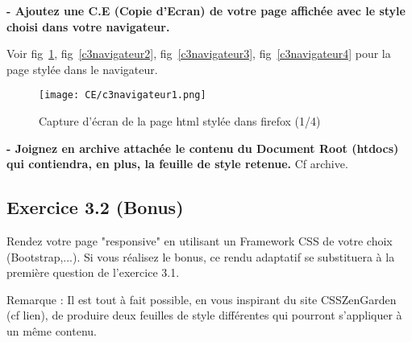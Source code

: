 \documentclass[11pt]{article}
\begin{document}

\textbf{- Ajoutez une C.E (Copie d’Ecran) de votre page affichée avec le style choisi dans votre navigateur.}

Voir fig~\ref{c3navigateur1}, fig~\ref{c3navigateur2}, fig~\ref{c3navigateur3}, fig~\ref{c3navigateur4} pour la page stylée dans le navigateur.

		\begin{figure}[h]
		\texttt{[image: CE/c3navigateur1.png]}
		\caption{Capture d’écran de la page html stylée dans firefox (1/4)}
		\label{c3navigateur1}
		\end{figure}	
		


\textbf{- Joignez en archive attachée le contenu du Document Root (htdocs) qui contiendra, en plus, la feuille de style retenue.} Cf archive.

\newpage

	\subsection*{Exercice 3.2 (Bonus)}
	
	Rendez votre page "responsive" en utilisant un Framework CSS de votre choix (Bootstrap,...). Si vous réalisez le bonus, ce rendu adaptatif se substituera à la première question de l’exercice 3.1.

Remarque : Il est tout à fait possible, en vous inspirant du site CSSZenGarden (cf lien), de produire deux feuilles de style différentes qui pourront s’appliquer à un même contenu.
\end{document}
